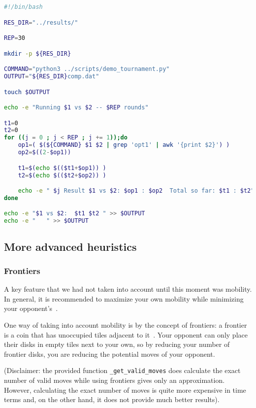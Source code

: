 \documentclass{article}
\begin{document}
\begin{lstlisting}[language=bash, caption = Comparing two heuristics,captionpos=t]
#!/bin/bash

RES_DIR="../results/"

REP=30

mkdir -p ${RES_DIR}

COMMAND="python3 ../scripts/demo_tournament.py"
OUTPUT="${RES_DIR}comp.dat"

touch $OUTPUT

echo -e "Running $1 vs $2 -- $REP rounds"

t1=0
t2=0
for ((j = 0 ; j < REP ; j += 1));do
    op1=( $(${COMMAND} $1 $2 | grep 'opt1' | awk '{print $2}') )
    op2=$((2-$op1))

    t1=$(echo $(($t1+$op1)) )
    t2=$(echo $(($t2+$op2)) )

    echo -e " $j Result $1 vs $2: $op1 : $op2  Total so far: $t1 : $t2"
done

echo -e "$1 vs $2:  $t1 $t2 " >> $OUTPUT
echo -e "   " >> $OUTPUT    
\end{lstlisting}

\subsection{More advanced heuristics}

\subsubsection{Frontiers}

A key feature that we had not taken into account until this moment was mobility. In general, it is recommended to maximize your own mobility while minimizing your opponent's~\autocite{reversistrategy}.

One way of taking into account mobility is by the concept of frontiers: a frontier is a coin that has unoccupied tiles adjacent to it~\autocite{reversistrategy}. Your opponent can only place their disks in empty tiles next to your own, so by reducing your number of frontier disks, you are reducing the potential moves of your opponent.

(Disclaimer: the provided function \texttt{\_get\_valid\_moves} does calculate the exact number of valid moves while using frontiers gives only an approximation. However, calculating the exact number of moves is quite more expensive in time terms and, on the other hand, it does not provide much better results).
\end{document}

